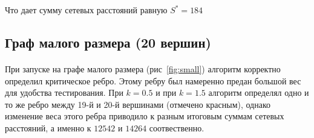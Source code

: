 \documentclass[12pt]{article}
\begin{document}
Что дает сумму сетевых расстояний равную $S^* = 184$

\subsection{Граф малого размера (20 вершин)}

\paragraph{}
При запуске на графе малого размера (рис~\ref{fig:small}) 
алгоритм корректно определил критическое ребро.
Этому ребру был намеренно предан большой вес для удобства тестирования.
При $k = 0.5$ и при $k = 1.5$ алгоритм определял одно
и то же ребро между 19-й и 20-й вершинами (отмечено красным),
однако изменение веса этого ребра приводило к разным итоговым
суммам сетевых расстояний, а именно к $12542$ и $14264$ соотвественно.
\end{document}
